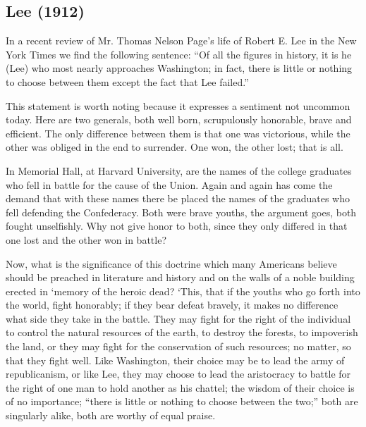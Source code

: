 \documentclass[letterpaper,10pt,english]{jupyterBook}
\begin{document}
\subsection{Lee (1912)}
\label{\detokenize{Volumes/03/05/lee:lee-1912}}\label{\detokenize{Volumes/03/05/lee::doc}}
\sphinxAtStartPar
In a recent review of Mr. Thomas Nelson Page’s life of Robert E. Lee in the New York Times we find the following sentence: “Of all the figures in history, it is he (Lee) who most nearly approaches Washington; in fact, there is little or nothing to choose between them except the fact that Lee failed.”

\sphinxAtStartPar
This statement is worth noting because it expresses a sentiment not uncommon to\sphinxhyphen{}day. Here are two gen­erals, both well born, scrupulously honorable, brave and efficient. The only difference between them is that one was victorious, while the other was obliged in the end to surrender. One won, the other lost; that is all.

\sphinxAtStartPar
In Memorial Hall, at Harvard University, are the names of the college graduates who fell in battle for the cause of the Union. Again and again has come the demand that with these names there be placed the names of the graduates who fell defending the Confederacy. Both were brave youths, the argument goes, both fought unselfishly. Why not give honor to both, since they only differed in that one lost and the other won in battle?

\sphinxAtStartPar
Now, what is the significance of this doctrine which many Americans believe should be preached in literature and history and on the walls of a noble building erected in ‘memory of the heroic dead? ‘This, that if the youths who go forth into the world, fight honorably; if they bear defeat bravely, it makes no difference what side they take in the battle. They may fight for the right of the individual to control the natural resources of the earth, to destroy the forests, to impoverish the land, or they may fight for the conservation of such resources; no matter, so that they fight well. Like Washington, their choice may be to lead the army of republicanism, or like Lee, they may choose to lead the aristocracy to battle for the right of one man to hold another as his chattel; the wisdom of their choice is of no importance; “there is little or nothing to choose between the two;” both are singularly alike, both are worthy of equal praise.
\end{document}
